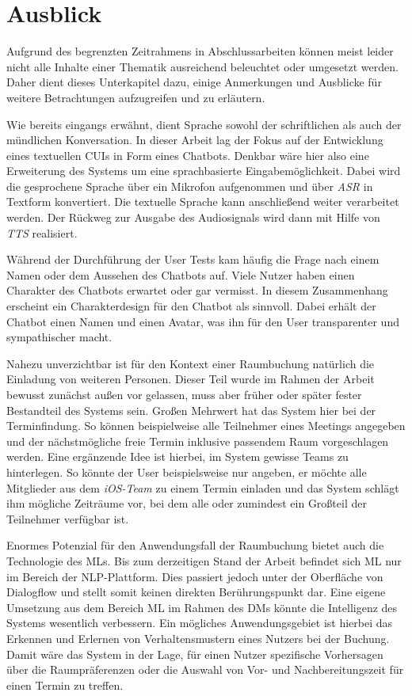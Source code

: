 \section{Ausblick}
\label{sec:ausblick}
Aufgrund des begrenzten Zeitrahmens in Abschlussarbeiten können meist leider nicht alle Inhalte einer Thematik ausreichend beleuchtet oder umgesetzt werden. Daher dient dieses Unterkapitel dazu, einige Anmerkungen und Ausblicke für weitere Betrachtungen aufzugreifen und zu erläutern. 

Wie bereits eingangs erwähnt, dient Sprache sowohl der schriftlichen als auch der mündlichen Konversation. In dieser Arbeit lag der Fokus auf der Entwicklung eines textuellen \acp{CUI} in Form eines Chatbots. Denkbar wäre hier also eine Erweiterung des Systems um eine sprachbasierte Eingabemöglichkeit. Dabei wird die gesprochene Sprache über ein Mikrofon aufgenommen und über \textit{\ac{ASR}} in Textform konvertiert. Die textuelle Sprache kann anschließend weiter verarbeitet werden. Der Rückweg zur Ausgabe des Audiosignals wird dann mit Hilfe von \textit{\ac{TTS}} realisiert.

Während der Durchführung der User Tests kam häufig die Frage nach einem Namen oder dem Aussehen des Chatbots auf. Viele Nutzer haben einen Charakter des Chatbots erwartet oder gar vermisst. In diesem Zusammenhang erscheint ein Charakterdesign für den Chatbot als sinnvoll. Dabei erhält der Chatbot einen Namen und einen Avatar, was ihn für den User transparenter und sympathischer macht. 

Nahezu unverzichtbar ist für den Kontext einer Raumbuchung natürlich die Einladung von weiteren Personen. Dieser Teil wurde im Rahmen der Arbeit bewusst zunächst außen vor gelassen, muss aber früher oder später fester Bestandteil des Systems sein. Großen Mehrwert hat das System hier bei der Terminfindung. So können beispielweise alle Teilnehmer eines Meetings angegeben und der nächstmögliche freie Termin inklusive passendem Raum vorgeschlagen werden. Eine ergänzende Idee ist hierbei, im System gewisse Teams zu hinterlegen. So könnte der User beispielsweise nur angeben, er möchte alle Mitglieder aus dem \textit{iOS-Team} zu einem Termin einladen und das System schlägt ihm mögliche Zeiträume vor, bei dem alle oder zumindest ein Großteil der Teilnehmer verfügbar ist. 

Enormes Potenzial für den Anwendungsfall der Raumbuchung bietet auch die Technologie des \aclp{ML}. Bis zum derzeitigen Stand der Arbeit befindet sich \acl{ML} nur im Bereich der \ac{NLP}-Plattform. Dies passiert jedoch unter der Oberfläche von Dialogflow und stellt somit keinen direkten Berührungspunkt dar. Eine eigene Umsetzung aus dem Bereich \ac{ML} im Rahmen des \aclp{DM} könnte die Intelligenz des Systems wesentlich verbessern. Ein mögliches Anwendungsgebiet ist hierbei das Erkennen und Erlernen von Verhaltensmustern eines Nutzers bei der Buchung. Damit wäre das System in der Lage, für einen Nutzer spezifische Vorhersagen über die Raumpräferenzen oder die Auswahl von Vor- und Nachbereitungszeit für einen Termin zu treffen. 